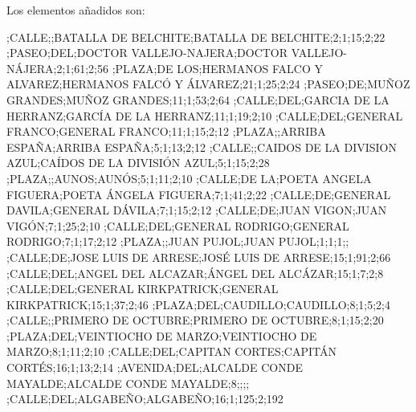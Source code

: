 \begin{itemize}
Los elementos añadidos son:
\begin{tiny}
;CALLE;;BATALLA DE BELCHITE;BATALLA DE BELCHITE;2;1;15;2;22
;PASEO;DEL;DOCTOR VALLEJO-NAJERA;DOCTOR VALLEJO-NÁJERA;2;1;61;2;56
;PLAZA;DE LOS;HERMANOS FALCO Y ALVAREZ;HERMANOS FALCÓ Y ÁLVAREZ;21;1;25;2;24
;PASEO;DE;MUÑOZ GRANDES;MUÑOZ GRANDES;11;1;53;2;64
;CALLE;DEL;GARCIA DE LA HERRANZ;GARCÍA DE LA HERRANZ;11;1;19;2;10
;CALLE;DEL;GENERAL FRANCO;GENERAL FRANCO;11;1;15;2;12
;PLAZA;;ARRIBA ESPAÑA;ARRIBA ESPAÑA;5;1;13;2;12
;CALLE;;CAIDOS DE LA DIVISION AZUL;CAÍDOS DE LA DIVISIÓN AZUL;5;1;15;2;28
;PLAZA;;AUNOS;AUNÓS;5;1;11;2;10
;CALLE;DE LA;POETA ANGELA FIGUERA;POETA ÁNGELA FIGUERA;7;1;41;2;22
;CALLE;DE;GENERAL DAVILA;GENERAL DÁVILA;7;1;15;2;12
;CALLE;DE;JUAN VIGON;JUAN VIGÓN;7;1;25;2;10
;CALLE;DEL;GENERAL RODRIGO;GENERAL RODRIGO;7;1;17;2;12
;PLAZA;;JUAN PUJOL;JUAN PUJOL;1;1;1;;
;CALLE;DE;JOSE LUIS DE ARRESE;JOSÉ LUIS DE ARRESE;15;1;91;2;66
;CALLE;DEL;ANGEL DEL ALCAZAR;ÁNGEL DEL ALCÁZAR;15;1;7;2;8
;CALLE;DEL;GENERAL KIRKPATRICK;GENERAL KIRKPATRICK;15;1;37;2;46
;PLAZA;DEL;CAUDILLO;CAUDILLO;8;1;5;2;4
;CALLE;;PRIMERO DE OCTUBRE;PRIMERO DE OCTUBRE;8;1;15;2;20
;PLAZA;DEL;VEINTIOCHO DE MARZO;VEINTIOCHO DE MARZO;8;1;11;2;10
;CALLE;DEL;CAPITAN CORTES;CAPITÁN CORTÉS;16;1;13;2;14
;AVENIDA;DEL;ALCALDE CONDE MAYALDE;ALCALDE CONDE MAYALDE;8;;;;
;CALLE;DEL;ALGABEÑO;ALGABEÑO;16;1;125;2;192

\end{tiny}
\end{itemize}
